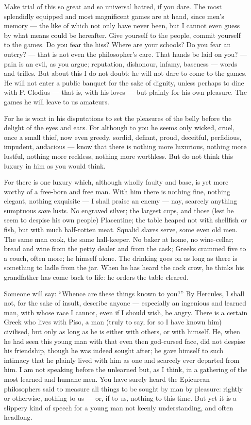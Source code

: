  Make trial of this so great and so universal hatred, if you dare. The most splendidly equipped and most magnificent games are at hand, since men's memory — the like of which not only have never been, but I cannot even guess by what means could be hereafter. Give yourself to the people, commit yourself to the games. Do you fear the hiss? Where are your schools? Do you fear an outcry? — that is not even the philosopher's care. That hands be laid on you? — pain is an evil, as you argue; reputation, dishonour, infamy, baseness — words and trifles. But about this I do not doubt: he will not dare to come to the games. He will not enter a public banquet for the sake of dignity, unless perhaps to dine with P. Clodius — that is, with his loves — but plainly for his own pleasure. The games he will leave to us amateurs.

 For he is wont in his disputations to set the pleasures of the belly before the delight of the eyes and ears. For although to you he seems only wicked, cruel, once a small thief, now even greedy, sordid, defiant, proud, deceitful, perfidious, impudent, audacious — know that there is nothing more luxurious, nothing more lustful, nothing more reckless, nothing more worthless. But do not think this luxury in him as you would think.

 For there is one luxury which, although wholly faulty and base, is yet more worthy of a free-born and free man. With him there is nothing fine, nothing elegant, nothing exquisite — I shall praise an enemy — nay, scarcely anything sumptuous save lusts. No engraved silver; the largest cups, and those (lest he seem to despise his own people) Placentine; the table heaped not with shellfish or fish, but with much half-rotten meat. Squalid slaves serve, some even old men. The same man cook, the same hall-keeper. No baker at home, no wine-cellar; bread and wine from the petty dealer and from the cask; Greeks crammed five to a couch, often more; he himself alone. The drinking goes on as long as there is something to ladle from the jar. When he has heard the cock crow, he thinks his grandfather has come back to life: he orders the table cleared.

 Someone will say: ``Whence are these things known to you?'' By Hercules, I shall not, for the sake of insult, describe anyone — especially an ingenious and learned man, with whose race I cannot, even if I should wish, be angry. There is a certain Greek who lives with Piso, a man (truly to say, for so I have known him) civilised, but only as long as he is either with others, or with himself. He, when he had seen this young man with that even then god-cursed face, did not despise his friendship, though he was indeed sought after; he gave himself to such intimacy that he plainly lived with him as one and scarcely ever departed from him. I am not speaking before the unlearned but, as I think, in a gathering of the most learned and humane men. You have surely heard the Epicurean philosophers said to measure all things to be sought by man by pleasure: rightly or otherwise, nothing to us — or, if to us, nothing to this time. But yet it is a slippery kind of speech for a young man not keenly understanding, and often headlong.

